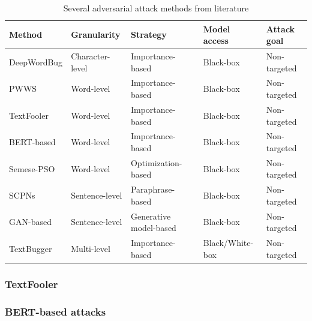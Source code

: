 \begin{table}[h]
  \footnotesize
  \centering
  \begin{tabular}{|l||l|l|l|l|}
    \hline
    Method & Granularity & Strategy & Model access & Attack goal \\
    \hline \hline
    DeepWordBug & Character-level & Importance-based & Black-box & Non-targeted \\ 
    \hline
    PWWS & Word-level & Importance-based & Black-box & Non-targeted \\
    \hline
    TextFooler & Word-level & Importance-based & Black-box & Non-targeted \\
    \hline
    BERT-based & Word-level & Importance-based & Black-box & Non-targeted \\
    \hline
    Semese-PSO & Word-level & Optimization-based & Black-box & Non-targeted \\
    \hline
    SCPNs & Sentence-level & Paraphrase-based & Black-box & Non-targeted \\
    \hline
    GAN-based & Sentence-level & Generative model-based & Black-box & Non-targeted \\
    \hline
    TextBugger & Multi-level & Importance-based & Black/White-box & Non-targeted \\
    \hline
  \end{tabular}
  \caption{Several adversarial attack methods from literature}
\label{tab:attack-methods}
\end{table}

\subsubsection{TextFooler}\label{subsubsec:textfooler}

\subsubsection{BERT-based attacks}\label{subsubsec:bert-based-attacks}
